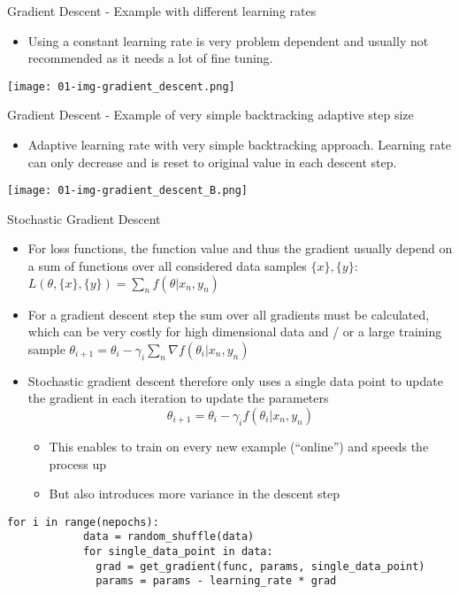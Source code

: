   \begin{frame}{Gradient Descent - Example with different learning rates}
    \begin{itemize}
      \item Using a constant learning rate is very problem dependent and usually not recommended as it needs a lot of fine tuning.
    \end{itemize}
    \texttt{[image: 01-img-gradient\_descent.png]}
  \end{frame}
  \begin{frame}{Gradient Descent - Example of very simple backtracking adaptive step size}
    \begin{itemize}
      \item Adaptive learning rate with very simple backtracking approach.
    Learning rate can only decrease and is reset to original value in each descent step.
    \end{itemize}
    \texttt{[image: 01-img-gradient\_descent\_B.png]}
  \end{frame}

  \begin{frame}[fragile]{Stochastic Gradient Descent}
    \begin{itemize}
      \item For loss functions, the function value and thus the gradient usually depend on a sum of functions over all considered data samples $\{x\}, \{y\}$: $L(\theta, \{x\}, \{y\}) = \sum_n f(\theta | x_n, y_n)$
      \item For a gradient descent step the sum over all gradients must be calculated, which can be very costly for high dimensional data and / or a large training sample $\theta_{i+1} = \theta_i - \gamma_i \sum_n \nabla f(\theta_i | x_n, y_n)$
      \item Stochastic gradient descent therefore only uses a single data point to update the gradient in each iteration to update the parameters
      \begin{equation*}
        \theta_{i+1} = \theta_i - \gamma_i f(\theta_i | x_n, y_n)
      \end{equation*}
      \begin{itemize}
        \item This enables to train on every new example (\enquote{online}) and speeds the process up
        \item But also introduces more variance in the descent step
      \end{itemize}
    \end{itemize}
    \begin{mdframed}
      \begin{lstlisting}[style=dark, gobble=6, title=\lsttitlelight{Example Implementation}]
        for i in range(nepochs):
            data = random_shuffle(data)
            for single_data_point in data:
              grad = get_gradient(func, params, single_data_point)
              params = params - learning_rate * grad
      \end{lstlisting}
    \end{mdframed}
  \end{frame}

